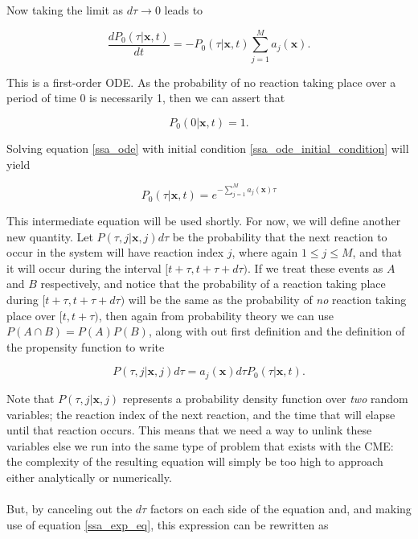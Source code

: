 \documentclass[ugrad,lot,lof,openright,11pt,oneside,onehalfspace]{RUthesis}
\begin{document}
				\noindent
				Now taking the limit as $d\tau \rightarrow 0$ leads to

				\begin{equation}\label{ssa_ode}
				\frac{dP_0(\tau|\mathbf{x},t)}{dt} = -P_0(\tau|\mathbf{x},t)\sum\limits_{j=1}^M a_j(\mathbf{x}).
				\end{equation}

				\noindent
				This is a first-order ODE. As the probability of no reaction taking place over a period of time 0 is necessarily 1, then we can assert that

				\begin{equation}\label{ssa_ode_initial_condition}
				P_0(0|\mathbf{x},t) = 1.
				\end{equation}

				\noindent
				Solving equation \eqref{ssa_ode} with initial condition \eqref{ssa_ode_initial_condition} will yield

				\begin{equation}\label{ssa_exp_eq}
				P_0(\tau|\mathbf{x},t) = e^{-\sum\limits_{j=1}^M a_j(\mathbf{x})\tau}
				\end{equation}

				\noindent
				This intermediate equation will be used shortly. For now, we will define another new quantity. Let $P(\tau,j|\mathbf{x},j)d\tau$ be the probability that the next reaction to occur in the system will have reaction index $j$, where again $1 \leq j \leq M$, and that it will occur during the interval $[t+\tau, t+\tau+d\tau)$. If we treat these events as $A$ and $B$ respectively, and notice that the probability of a reaction taking place during $[t+\tau, t+\tau+d\tau)$ will be the same as the probability of \textit{no} reaction taking place over $[t,t+\tau)$, then again from probability theory we can use $P(A \cap B) = P(A)P(B)$, along with out first definition and the definition of the propensity function to write

				\begin{equation*}
				P(\tau,j|\mathbf{x},j)d\tau = a_j(\mathbf{x})d\tau P_0(\tau|\mathbf{x},t).
				\end{equation*}

				\noindent
				Note that $P(\tau,j|\mathbf{x},j)$ represents a probability density function over \textit{two} random variables; the reaction index of the next reaction, and the time that will elapse until that reaction occurs. This means that we need a way to unlink these variables else we run into the same type of problem that exists with the CME: the complexity of the resulting equation will simply be too high to approach either analytically or numerically.\\
				\\
				But, by canceling out the $d\tau$ factors on each side of the equation and, and making use of equation \eqref{ssa_exp_eq}, this expression can be rewritten as
\end{document}
